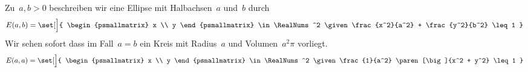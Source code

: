 \documentclass[../full]{subfiles}
\begin{document}



    Zu~\( a, b > 0 \) beschreiben wir
    eine Ellipse mit Halbachsen~\( a \) und~\( b \)
    durch
    \begin{equation*}
        E \paren{a, b} = \set[\Big]{
            \begin{psmallmatrix} x \\ y \end{psmallmatrix} \in \RealNums^2
            \given \frac{x^2}{a^2} + \frac{y^2}{b^2} \leq 1
        }
    \end{equation*}
    Wir sehen sofort dass im Fall~\( a = b \)
    ein Kreis mit Radius~\( a \) und Volumen~\( a^2 \pi \) vorliegt.
    \begin{equation*}
        E \paren{a, a} = \set[\Big]{
            \begin{psmallmatrix} x \\ y \end{psmallmatrix} \in \RealNums^2
            \given \frac{1}{a^2} \paren[\big]{x^2 + y^2} \leq 1
        }
    \end{equation*}
\end{document}
